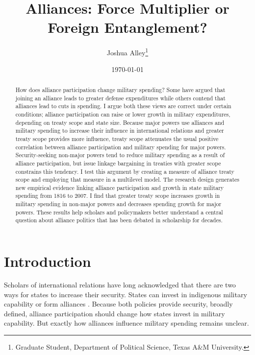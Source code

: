 \documentclass[12pt]{article}
\title{\textbf{Alliances: Force Multiplier or Foreign Entanglement?}}
\author{Joshua Alley\footnote{Graduate Student,
Department of Political Science, Texas A\&M University.}}
\date{{\normalsize \today}}
\begin{document}
\maketitle 

\newpage 

\doublespace 

\begin{abstract}
How does alliance participation change military spending? 
Some have argued that joining an alliance leads to greater defense expenditures while others contend that alliances lead to cuts in spending.
I argue both these views are correct under certain conditions; alliance participation can raise or lower growth in military expenditures, depending on treaty scope and state size. 
Because major powers use alliances and military spending to increase their influence in international relations and greater treaty scope provides more influence, treaty scope attenuates the usual positive correlation between alliance participation and military spending for major powers. 
Security-seeking non-major powers tend to reduce military spending as a result of alliance participation, but issue linkage bargaining in treaties with greater scope constrains this tendency. 
I test this argument by creating a measure of alliance treaty scope and employing that measure in a multilevel model. 
The research design generates new empirical evidence linking alliance participation and growth in state military spending from 1816 to 2007. 
I find that greater treaty scope increases growth in military spending in non-major powers and decreases spending growth for major powers.  
These results help scholars and policymakers better understand a central question about alliance politics that has been debated in scholarship for decades. 
\end{abstract}



\section{Introduction}


Scholars of international relations have long acknowledged that there are two ways for states to increase their security. 
States can invest in indigenous military capability or form alliances \citep{Morgenthau1948, Morrow1993}.
Because both policies provide security, broadly defined, alliance participation should change how states invest in military capability. 
But exactly how alliances influence military spending remains unclear. 
\end{document}
